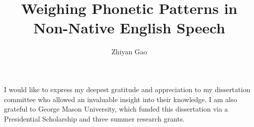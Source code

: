 \documentclass[11 pt]{report}
\begin{document}
\setmainfont{Times New Roman}
\title{Weighing Phonetic Patterns in Non-Native English Speech\\
            }
\author{Zhiyan Gao}







\secondmember{}

\thirdmember{}

\fourthmember{}






\signaturepage

\titlepage

\copyrightpage





\acknowledgementspage


\noindent I would like to express my deepest gratitude and appreciation to my dissertation committee who allowed an invaluable insight into their knowledge. I am also grateful to George Mason University, which funded this dissertation via a Presidential Scholarship and three summer research grants. 
\end{document}
